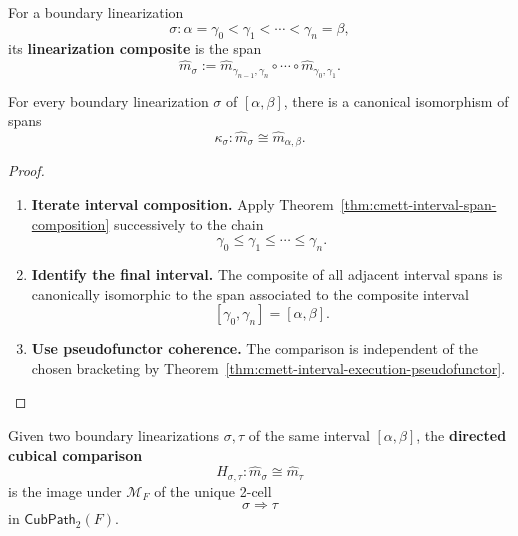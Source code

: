 \begin{definition}
\label{def:cmett-linearization-composite}
    For a boundary linearization
    \[
        \sigma:
        \alpha=\gamma_0<\gamma_1<\cdots<\gamma_n=\beta,
    \]
    its \textbf{linearization composite} is the span
    \[
        \widehat m_{\sigma}
        :=
        \widehat m_{\gamma_{n-1},\gamma_n}
        \circ\cdots\circ
        \widehat m_{\gamma_0,\gamma_1}.
    \]
\end{definition}

\begin{proposition}
\label{prop:cmett-linearization-composites-interval-spans}
    For every boundary linearization \(\sigma\) of \([\alpha,\beta]\), there
    is a canonical isomorphism of spans
    \[
        \kappa_\sigma:
        \widehat m_{\sigma}
        \cong
        \widehat m_{\alpha,\beta}.
    \]
\end{proposition}

\begin{proof}
    \leavevmode
    \begin{enumerate}
        \item \textbf{Iterate interval composition.}
        Apply Theorem~\ref{thm:cmett-interval-span-composition} successively
        to the chain
        \[
            \gamma_0\leq\gamma_1\leq\cdots\leq\gamma_n.
        \]

        \item \textbf{Identify the final interval.}
        The composite of all adjacent interval spans is canonically
        isomorphic to the span associated to the composite interval
        \[
            [\gamma_0,\gamma_n]=[\alpha,\beta].
        \]

        \item \textbf{Use pseudofunctor coherence.}
        The comparison is independent of the chosen bracketing by
        Theorem~\ref{thm:cmett-interval-execution-pseudofunctor}.
    \end{enumerate}
\end{proof}

\begin{definition}
\label{def:cmett-directed-cubical-comparison}
    Given two boundary linearizations \(\sigma,\tau\) of the same interval
    \([\alpha,\beta]\), the \textbf{directed cubical comparison}
    \[
        H_{\sigma,\tau}:
        \widehat m_\sigma\cong\widehat m_\tau
    \]
    is the image under \(\mathcal M_F\) of the unique 2-cell
    \[
        \sigma\Longrightarrow\tau
    \]
    in \(\mathsf{CubPath}_2(F)\).
\end{definition}

